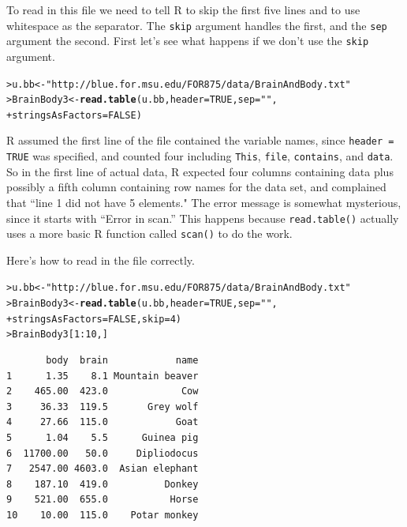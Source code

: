 \documentclass[12pt,oneside]{book}\usepackage[]{graphicx}\usepackage[]{color}
\makeatletter
\newcommand{\hlnum}[1]{\textcolor[rgb]{0.686,0.059,0.569}{#1}}%
\newcommand{\hlstr}[1]{\textcolor[rgb]{0.192,0.494,0.8}{#1}}%
\newcommand{\hlopt}[1]{\textcolor[rgb]{0,0,0}{#1}}%
\newcommand{\hlstd}[1]{\textcolor[rgb]{0.345,0.345,0.345}{#1}}%
\newcommand{\hlkwb}[1]{\textcolor[rgb]{0.69,0.353,0.396}{#1}}%
\newcommand{\hlkwc}[1]{\textcolor[rgb]{0.333,0.667,0.333}{#1}}%
\newcommand{\hlkwd}[1]{\textcolor[rgb]{0.737,0.353,0.396}{\textbf{#1}}}%
\newenvironment{kframe}{%
 \def\at@end@of@kframe{}%
 \ifinner\ifhmode%
  \def\at@end@of@kframe{\end{minipage}}%
  \begin{minipage}{\columnwidth}%
 \fi\fi%
 \def\FrameCommand##1{\hskip\@totalleftmargin \hskip-\fboxsep
 \colorbox{shadecolor}{##1}\hskip-\fboxsep
     \hskip-\linewidth \hskip-\@totalleftmargin \hskip\columnwidth}%
 \MakeFramed {\advance\hsize-\width
   \@totalleftmargin\z@ \linewidth\hsize
   \@setminipage}}%
 {\par\unskip\endMakeFramed%
 \at@end@of@kframe}
\newenvironment{knitrout}{}{} %
\makeatother
\begin{document}
To read in this file we need to tell R to skip the first five lines and to use whitespace as the separator. The \verb+skip+ argument handles the first, and the \verb+sep+ argument the second. First let's see what happens if we don't use the \verb+skip+ argument.
\begin{knitrout}
\color{fgcolor}\begin{kframe}
\begin{alltt}
\hlstd{> }\hlstd{u.bb} \hlkwb{<-} \hlstr{"http://blue.for.msu.edu/FOR875/data/BrainAndBody.txt"}
\hlstd{> }\hlstd{BrainBody3} \hlkwb{<-} \hlkwd{read.table}\hlstd{(u.bb,} \hlkwc{header} \hlstd{=} \hlnum{TRUE}\hlstd{,} \hlkwc{sep} \hlstd{=} \hlstr{" "}\hlstd{,}
\hlstd{+ }                         \hlkwc{stringsAsFactors} \hlstd{=} \hlnum{FALSE}\hlstd{)}
\end{alltt}


{\ttfamily\noindent\bfseries\color{errorcolor}{Error in scan(file = file, what = what, sep = sep, quote = quote, dec = dec, : line 1 did not have 5 elements}}\end{kframe}
\end{knitrout}
R assumed the first line of the file contained the variable names, since \verb+header = TRUE+ was specified, and counted four including \verb+This+, \verb+file+, \verb+contains+, and \verb+data+. So in the first line of actual data, R expected four columns containing data plus possibly a fifth column containing row names for the data set, and complained that ``line 1 did not have 5 elements." The error message is somewhat mysterious, since it starts with ``Error in scan.'' This happens because \verb+read.table()+ actually uses a more basic R function called \verb+scan()+ to do the work. 

Here's how to read in the file correctly.
\begin{knitrout}
\color{fgcolor}\begin{kframe}
\begin{alltt}
\hlstd{> }\hlstd{u.bb} \hlkwb{<-} \hlstr{"http://blue.for.msu.edu/FOR875/data/BrainAndBody.txt"}
\hlstd{> }\hlstd{BrainBody3} \hlkwb{<-} \hlkwd{read.table}\hlstd{(u.bb,} \hlkwc{header} \hlstd{=} \hlnum{TRUE}\hlstd{,} \hlkwc{sep} \hlstd{=} \hlstr{" "}\hlstd{,}
\hlstd{+ }                         \hlkwc{stringsAsFactors} \hlstd{=} \hlnum{FALSE}\hlstd{,} \hlkwc{skip} \hlstd{=} \hlnum{4}\hlstd{)}
\hlstd{> }\hlstd{BrainBody3[}\hlnum{1}\hlopt{:}\hlnum{10}\hlstd{,]}
\end{alltt}
\begin{verbatim}
       body  brain            name
1      1.35    8.1 Mountain beaver
2    465.00  423.0             Cow
3     36.33  119.5       Grey wolf
4     27.66  115.0            Goat
5      1.04    5.5      Guinea pig
6  11700.00   50.0     Dipliodocus
7   2547.00 4603.0  Asian elephant
8    187.10  419.0          Donkey
9    521.00  655.0           Horse
10    10.00  115.0    Potar monkey
\end{verbatim}
\end{kframe}
\end{knitrout}
\end{document}
